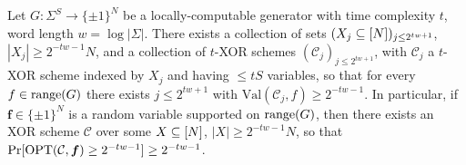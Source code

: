 \begin{theorem}\label{cellprobe:thm:cell-csp}
Let $G: \Sigma^S \to \{\pm 1\}^{N}$ be a locally-computable generator with time complexity $t$, word length $w= \log |\Sigma|$. There exists a collection of sets $(X_j \subseteq [N])_{j \leq 2^{tw + 1}}$, $|X_j| \geq 2^{-tw-1}N$, and a collection of $t$-XOR schemes $(\mathcal{C}_j)_{j \leq 2^{tw + 1}}$, with $\mathcal{C}_j$ a $t$-XOR scheme indexed by $X_j$ and having $\leq tS$ variables, so that for every $f\in \mathrm{range}(G)$ there exists $j \leq 2^{tw + 1}$ with $\mathrm{Val}(\mathcal{C}_j,f) \geq 2^{-tw-1}$.
In particular, if $\bm{f} \in \{\pm 1\}^N$ is a random variable supported on $\mathrm{range}(G)$, then there exists an XOR scheme 
$\mathcal{C}$ over some $X \subseteq [N]$, $|X| \geq 2^{-tw-1}N$, so that $\Pr[\mathrm{OPT}(\mathcal{C},\bm{f}) \geq 2^{-tw-1}] \geq 2^{-tw-1}$.
\end{theorem}
